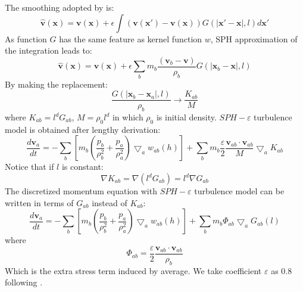 \documentclass[gmd, manuscript]{copernicus}
\begin{document}
The smoothing adopted by \citet{monaghan2011turbulence}  is:
\begin{equation}
\widehat{\textbf{v}}\left(\textbf{x}\right)=\textbf{v}\left(\textbf{x}\right)+ \epsilon \int \left(\textbf{v}\left(\textbf{x} \prime\right)-\textbf{v}\left(\textbf{x}\right)\right)G\left(\vert \textbf{x} \prime - \textbf{x} \vert, l\right) d\textbf{x} \prime
\end{equation}
As function $G$ has the same feature as kernel function $w$, SPH approximation of the integration leads to:
\begin{equation} \label{eq:SPH-epsilon-filtering}
\widehat{\textbf{v}}\left(\textbf{x}\right)=\textbf{v}\left(\textbf{x}\right)+\epsilon \sum_b m_b \dfrac{\left(\textbf{v}_b -\textbf{v}\right)}{\rho _b} G\left(\vert \textbf{x} _b - \textbf{x} \vert, l\right)
\end{equation}
By making the replacement:
\begin{equation}
\label{eq:replacement-in-turb-derive}
\dfrac{G\left(\vert \textbf{x} _b - \textbf{x} _a \vert, l\right)}{\rho _b} \rightarrow \dfrac{K_{ab}}{M}
\end{equation}
where $K_{ab} = l^d G_{ab}$, $M = \rho_0 l^d$ in which $\rho_0$ is initial density. $SPH-\varepsilon$ turbulence model is obtained after lengthy derivation:
\begin{equation}
\label{eq:monaghan-mom-turb}
\dfrac{d \textbf{v}_a}{dt} = -\sum_b \left[ m_b \left(\dfrac{p_b}{\rho_b^2} + \dfrac{p_a}{\rho_a^2}\right) \bigtriangledown_aw_{a b}\left(h\right)\right] + \sum_b m_b \dfrac{\varepsilon}{2} \dfrac{\textbf{v}_{ab} \cdot \textbf{v}_{ab}}{M} \bigtriangledown_a K_{ab}
\end{equation}
Notice that if $l$ is constant: 
\begin{equation}
\nabla K_{ab} = \nabla \left(l^d G_{ab}\right) = l^d \nabla G_{ab}
\end{equation}
The discretized momentum equation with $SPH-\varepsilon$ turbulence model can be written in terms of $G_{ab}$ instead of $K_{ab}$:
\begin{equation}
\label{eq:SPH-mom-epsilon-turb}
\dfrac{d \textbf{v}_a}{dt} = -\sum_b \left[m_b \left(\dfrac{p_b}{\rho_b^2} + \dfrac{p_a}{\rho_a^2}\right) \bigtriangledown_aw_{a b}\left(h\right)\right] + \sum_b m_b \Phi_{ab}\bigtriangledown_aG_{ab}\left(l\right)
\end{equation}
where 
\begin{equation}
\Phi_{ab}=\dfrac{\varepsilon}{2} \dfrac{\textbf{v}_{ab} \cdot \textbf{v}_{ab}}{\rho_b} 
\end{equation}
Which is the extra stress term induced by average. We take coefficient $\varepsilon$ as 0.8 following \citet{monaghan2011turbulence}.
\end{document}

